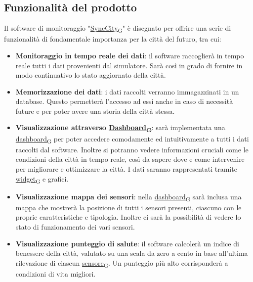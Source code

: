 \subsection{Funzionalità del prodotto}
Il software di monitoraggio "\href{https://7last.github.io/docs/rtb/documentazione-interna/glossario\#synccity}{SyncCity\textsubscript{G}}" è disegnato per offrire una serie di funzionalità di fondamentale importanza per la città del futuro, tra cui:
\begin{itemize}
    \item \textbf{Monitoraggio in tempo reale dei dati}: il software raccoglierà in tempo reale tutti i dati provenienti dal simulatore. Sarà così in grado di fornire in modo continuativo lo stato aggiornato della città. 
    \item \textbf{Memorizzazione dei dati}: i dati raccolti verranno immagazzinati in un database. Questo permetterà l'accesso ad essi anche in caso di necessità future e  per poter avere una storia della città stessa.
    \item \textbf{Visualizzazione attraverso \href{https://7last.github.io/docs/rtb/documentazione-interna/glossario\#dashboard}{Dashboard\textsubscript{G}}}: sarà implementata una \href{https://7last.github.io/docs/rtb/documentazione-interna/glossario\#dashboard}{dashboard\textsubscript{G}} per poter accedere comodamente ed intuitivamente a tutti i dati raccolti dal software. Inoltre si potranno vedere informazioni cruciali come le condizioni della città in tempo reale, così da sapere dove e come intervenire per migliorare e ottimizzare la città. I dati saranno rappresentati tramite \href{https://7last.github.io/docs/rtb/documentazione-interna/glossario\#widget}{widget\textsubscript{G}} e grafici.
    \item \textbf{Visualizzazione mappa dei sensori}: nella \href{https://7last.github.io/docs/rtb/documentazione-interna/glossario\#dashboard}{dashboard\textsubscript{G}} sarà inclusa una mappa che mostrerà la posizione di tutti i sensori presenti, ciascuno con le proprie caratteristiche e tipologia. Inoltre ci sarà la possibilità di vedere lo stato di funzionamento dei vari sensori.
    \item \textbf{Visualizzazione punteggio di salute}: il software calcolerà un indice di benessere della città, valutato su una scala da zero a cento in base all'ultima rilevazione di ciascun \href{https://7last.github.io/docs/rtb/documentazione-interna/glossario\#sensore}{sensore\textsubscript{G}}. Un punteggio più alto corrisponderà a condizioni di vita migliori.

\end{itemize}
